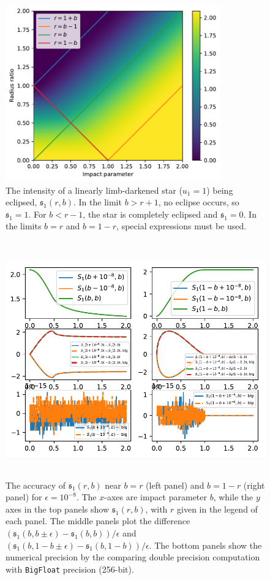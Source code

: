 \documentclass[modern]{aastex61}
\begin{document}
\begin{figure}[p!]
    \begin{centering}
    \includegraphics[height=3in]{figures/julia/transit_linear.pdf}
    \caption{The intensity of a linearly limb-darkened star ($u_1=1$) being
    eclipsed, $\mathfrak{s}_1(r,b)$.
    In the limit $b > r+1$, no eclipse occurs, so $\mathfrak{s}_1=1$.  For $b < r-1$, the star
    is completely eclipsed and $\mathfrak{s}_1=0$.  In the limits $b=r$ and $b=1-r$, special
    expressions must be used.
    \label{transit_linear}}
    \end{centering}
\end{figure}

\begin{figure}[p!]
    \begin{centering}
    \includegraphics[height=4in]{figures/julia/s2_machine.pdf}
    \caption{The accuracy of $\mathfrak{s}_1(r,b)$ near $b=r$ (left panel) and
    $b=1-r$ (right panel) for $\epsilon = 10^{-8}$. The $x$-axes are impact parameter $b$,
    while the $y$ axes in the top panels show $\mathfrak{s}_1(r,b)$, with $r$
    given in the legend of each panel. The middle panels plot
    the difference $(\mathfrak{s}_1(b,b\pm\epsilon)-\mathfrak{s}_1(b,b))/\epsilon$
    and $(\mathfrak{s}_1(b,1-b\pm\epsilon)-\mathfrak{s}_1(b,1-b))/\epsilon$. The bottom
    panels show the numerical precision by the comparing double precision
    computation with \texttt{BigFloat} precision (256-bit). \label{s2_machine}}
    \end{centering}
\end{figure}
\end{document}
